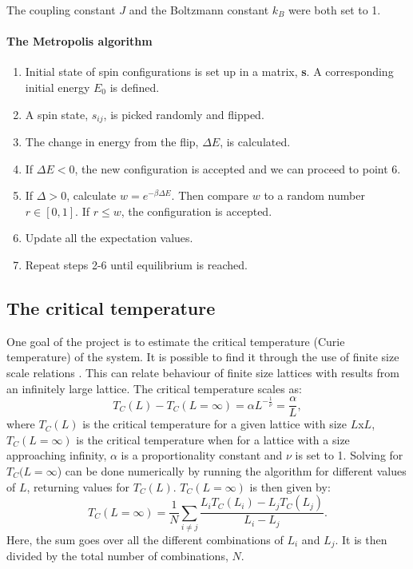 \documentclass[10pt,a4paper,titlepage]{article}
\begin{document}
The coupling constant $J$ and the Boltzmann constant $k_B$ were both set to 1. 

\paragraph{The Metropolis algorithm}
\begin{enumerate}
  \item Initial state of spin configurations is set up in a matrix, \textbf{s}. A corresponding initial energy $E_0$ is defined.
  \item A spin state, $s_{ij}$, is picked randomly and flipped.
  \item The change in energy from the flip, $\Delta E$, is calculated.
  \item If $\Delta E < 0$, the new configuration is accepted and we can proceed to point 6. 
  \item If $\Delta > 0$, calculate $w = e^{-\beta\Delta E}$. Then compare $w$ to a random number $r \in[0,1]$. If $r\leq w$, the configuration is accepted. 
  \item Update all the expectation values.
  \item Repeat steps 2-6 until equilibrium is reached. 
\end{enumerate}

\subsection{The critical temperature}
One goal of the project is to estimate the critical temperature (Curie temperature) of the system. It is possible to find it through the use of finite size scale relations \cite{project}. This can relate behaviour of finite size lattices with results from an infinitely large lattice. The critical temperature scales as:
\begin{equation}
T_{C}(L)-T_{C}(L=\infty)=\alpha L^{-\frac{1}{\nu}}=\frac{\alpha}{L},
\end{equation}
where $T_C(L)$ is the critical temperature for a given lattice with size $L$x$L$, $T_{C}(L=\infty)$ is the critical temperature when for a lattice with a size approaching  infinity, $\alpha$ is a proportionality constant and $\nu$ is set to 1. Solving for $T_C(L=\infty$) can be done numerically by running the algorithm for different values of $L$, returning values for $T_C(L)$. $T_C(L=\infty)$ is then given by:
\begin{equation}
\label{eq:crit}
T_C(L=\infty) = \frac{1}{N}\sum_{i\neq j}\frac{L_iT_C(L_i)-L_jT_C(L_j)}{L_i-L_j}.
\end{equation}
Here, the sum goes over all the different combinations of $L_i$ and $L_j$. It is then divided by the total number of combinations, $N$.
\end{document}
